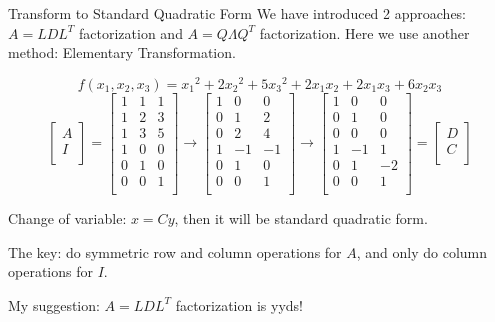 \documentclass{beamer}
\begin{document}
\begin{frame}{Transform to Standard Quadratic Form}
We have introduced 2 approaches: $A=LDL^T$ factorization and $A=Q\varLambda Q^T$ factorization. Here we use another method: Elementary Transformation.

\begin{equation*}
    f\left( x_1, x_2, x_3 \right) ={x_1}^2+2{x_2}^2+5{x_3}^2+2x_1x_2+2x_1x_3+6x_2x_3
\end{equation*}
\begin{equation*}
    \left[ \begin{array}{c}
        A\\
        I\\
    \end{array} \right] =\left[ \begin{matrix}
        1&		1&		1\\
        1&		2&		3\\
        1&		3&		5\\
        1&		0&		0\\
        0&		1&		0\\
        0&		0&		1\\
    \end{matrix} \right] \rightarrow \left[ \begin{matrix}
        1&		0&		0\\
        0&		1&		2\\
        0&		2&		4\\
        1&		-1&		-1\\
        0&		1&		0\\
        0&		0&		1\\
    \end{matrix} \right] \rightarrow \left[ \begin{matrix}
        1&		0&		0\\
        0&		1&		0\\
        0&		0&		0\\
        1&		-1&		1\\
        0&		1&		-2\\
        0&		0&		1\\
    \end{matrix} \right] =\left[ \begin{array}{c}
        D\\
        C\\
    \end{array} \right]
\end{equation*}

Change of variable: $x=Cy$, then it will be standard quadratic form.

\vspace{3pt}
The key: do symmetric row and column operations for $A$, and only do column operations for $I$.

\vspace{3pt}
My suggestion: $A=LDL^T$ factorization is yyds!
\end{frame}
\end{document}
